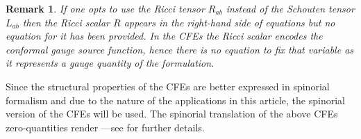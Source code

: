 \documentclass[10pt,a4paper]{article}
\theoremstyle{plain}
\newtheorem{remark}{Remark}
\begin{document}
{ \color{blue}

\begin{remark}
  \emph{ If one opts to use the Ricci tensor $R_{ab}$ instead of the Schouten tensor $L_{ab}$ then
    the Ricci scalar $R$ appears in the right-hand side of
    equations but no equation for it has been provided.
    In the CFEs the Ricci scalar encodes the \emph{conformal gauge source function}, hence
    there is no equation to fix that variable as it represents a gauge quantity of the formulation.}
\end{remark}


Since the structural properties of the CFEs are better expressed in
spinorial formalism and due to the nature of the applications in this
article, the spinorial version of the CFEs will be used. The spinorial
 translation of the above CFEs zero-quantities render
---see \cite{CFEbook} for further details.

}
\end{document}
